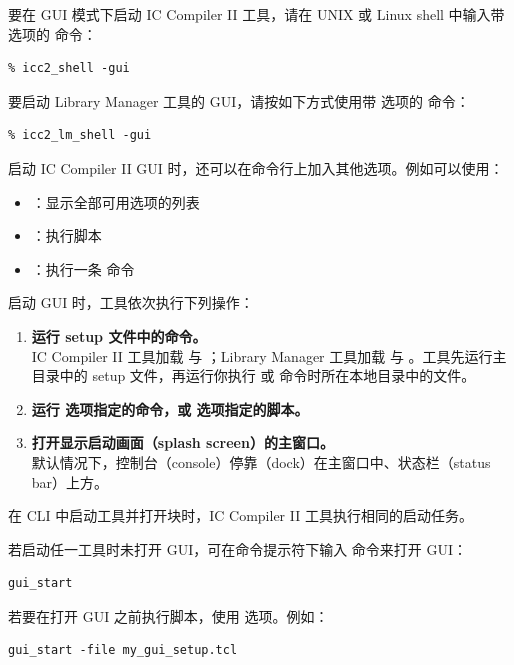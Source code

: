 要在 GUI 模式下启动 IC Compiler II 工具，请在 UNIX 或 Linux shell 中输入带  选项的  命令：
\begin{lstlisting}
% icc2_shell -gui
\end{lstlisting}

要启动 Library Manager 工具的 GUI，请按如下方式使用带  选项的  命令：
\begin{lstlisting}
% icc2_lm_shell -gui
\end{lstlisting}

启动 IC Compiler II GUI 时，还可以在命令行上加入其他选项。例如可以使用：
\begin{itemize}
  \item {}：显示全部可用选项的列表
  \item {} ：执行脚本
  \item {} ：执行一条  命令
\end{itemize}

启动 GUI 时，工具依次执行下列操作：
\begin{enumerate}
  \item \textbf{运行 setup 文件中的命令。}\\
        IC Compiler II 工具加载  与 ；Library Manager 工具加载  与 。工具先运行主目录中的 setup 文件，再运行你执行  或  命令时所在本地目录中的文件。
  \item \textbf{运行  选项指定的命令，或  选项指定的脚本。}
  \item \textbf{打开显示启动画面（splash screen）的主窗口。}\\
        默认情况下，控制台（console）停靠（dock）在主窗口中、状态栏（status bar）上方。
\end{enumerate}

在 CLI 中启动工具并打开块时，IC Compiler II 工具执行相同的启动任务。

若启动任一工具时未打开 GUI，可在命令提示符下输入  命令来打开 GUI：
\begin{lstlisting}
gui_start
\end{lstlisting}

若要在打开 GUI 之前执行脚本，使用  选项。例如：
\begin{lstlisting}
gui_start -file my_gui_setup.tcl
\end{lstlisting}


